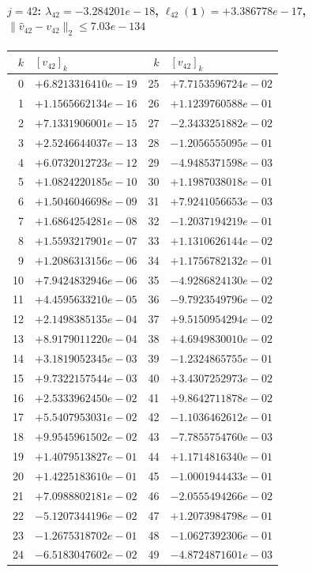 \documentclass[11pt]{article}
\begin{document}
\paragraph{$j = 42$: $\lambda_{42} = -3.284201e-18$, \quad $\ell_{42}(\mathbf{1}) = +3.386778e-17$, \quad $\|\hat{v}_{42} - v_{42}\|_2 \leq 7.03e-134$}
\begin{center}
{\footnotesize
\begin{tabular}{r@{\;\;}l@{\quad}r@{\;\;}l}
\toprule
$k$ & $[v_{42}]_k$ & $k$ & $[v_{42}]_k$ \\
\midrule
0 & $+6.8213316410e-19$ & 25 & $+7.7153596724e-02$ \\
1 & $+1.1565662134e-16$ & 26 & $+1.1239760588e-01$ \\
2 & $+7.1331906001e-15$ & 27 & $-2.3433251882e-02$ \\
3 & $+2.5246644037e-13$ & 28 & $-1.2056555095e-01$ \\
4 & $+6.0732012723e-12$ & 29 & $-4.9485371598e-03$ \\
5 & $+1.0824220185e-10$ & 30 & $+1.1987038018e-01$ \\
6 & $+1.5046046698e-09$ & 31 & $+7.9241056653e-03$ \\
7 & $+1.6864254281e-08$ & 32 & $-1.2037194219e-01$ \\
8 & $+1.5593217901e-07$ & 33 & $+1.1310626144e-02$ \\
9 & $+1.2086313156e-06$ & 34 & $+1.1756782132e-01$ \\
10 & $+7.9424832946e-06$ & 35 & $-4.9286824130e-02$ \\
11 & $+4.4595633210e-05$ & 36 & $-9.7923549796e-02$ \\
12 & $+2.1498385135e-04$ & 37 & $+9.5150954294e-02$ \\
13 & $+8.9179011220e-04$ & 38 & $+4.6949830010e-02$ \\
14 & $+3.1819052345e-03$ & 39 & $-1.2324865755e-01$ \\
15 & $+9.7322157544e-03$ & 40 & $+3.4307252973e-02$ \\
16 & $+2.5333962450e-02$ & 41 & $+9.8642711878e-02$ \\
17 & $+5.5407953031e-02$ & 42 & $-1.1036462612e-01$ \\
18 & $+9.9545961502e-02$ & 43 & $-7.7855754760e-03$ \\
19 & $+1.4079513827e-01$ & 44 & $+1.1714816340e-01$ \\
20 & $+1.4225183610e-01$ & 45 & $-1.0001944433e-01$ \\
21 & $+7.0988802181e-02$ & 46 & $-2.0555494266e-02$ \\
22 & $-5.1207344196e-02$ & 47 & $+1.2073984798e-01$ \\
23 & $-1.2675318702e-01$ & 48 & $-1.0627392306e-01$ \\
24 & $-6.5183047602e-02$ & 49 & $-4.8724871601e-03$ \\
\bottomrule
\end{tabular}
}
\end{center}
\end{document}
